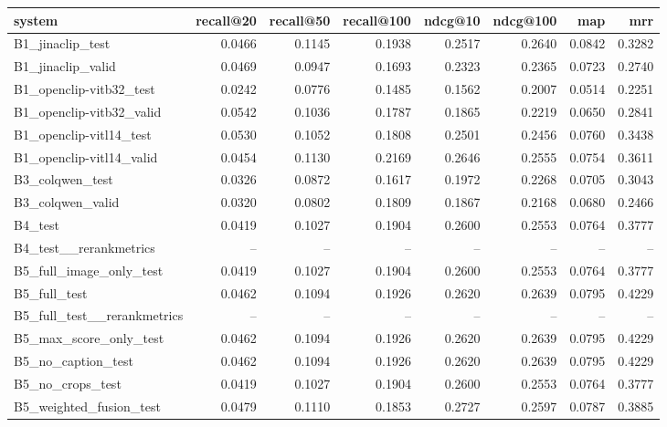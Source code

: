 \begin{tabular}{lrrrrrrr}
\toprule
system & recall@20 & recall@50 & recall@100 & ndcg@10 & ndcg@100 & map & mrr \\
\midrule
B1\_jinaclip\_test & 0.0466 & 0.1145 & 0.1938 & 0.2517 & 0.2640 & 0.0842 & 0.3282 \\
B1\_jinaclip\_valid & 0.0469 & 0.0947 & 0.1693 & 0.2323 & 0.2365 & 0.0723 & 0.2740 \\
B1\_openclip-vitb32\_test & 0.0242 & 0.0776 & 0.1485 & 0.1562 & 0.2007 & 0.0514 & 0.2251 \\
B1\_openclip-vitb32\_valid & 0.0542 & 0.1036 & 0.1787 & 0.1865 & 0.2219 & 0.0650 & 0.2841 \\
B1\_openclip-vitl14\_test & 0.0530 & 0.1052 & 0.1808 & 0.2501 & 0.2456 & 0.0760 & 0.3438 \\
B1\_openclip-vitl14\_valid & 0.0454 & 0.1130 & 0.2169 & 0.2646 & 0.2555 & 0.0754 & 0.3611 \\
B3\_colqwen\_test & 0.0326 & 0.0872 & 0.1617 & 0.1972 & 0.2268 & 0.0705 & 0.3043 \\
B3\_colqwen\_valid & 0.0320 & 0.0802 & 0.1809 & 0.1867 & 0.2168 & 0.0680 & 0.2466 \\
B4\_test & 0.0419 & 0.1027 & 0.1904 & 0.2600 & 0.2553 & 0.0764 & 0.3777 \\
B4\_test\_\_rerankmetrics & -- & -- & -- & -- & -- & -- & -- \\
B5\_full\_image\_only\_test & 0.0419 & 0.1027 & 0.1904 & 0.2600 & 0.2553 & 0.0764 & 0.3777 \\
B5\_full\_test & 0.0462 & 0.1094 & 0.1926 & 0.2620 & 0.2639 & 0.0795 & 0.4229 \\
B5\_full\_test\_\_rerankmetrics & -- & -- & -- & -- & -- & -- & -- \\
B5\_max\_score\_only\_test & 0.0462 & 0.1094 & 0.1926 & 0.2620 & 0.2639 & 0.0795 & 0.4229 \\
B5\_no\_caption\_test & 0.0462 & 0.1094 & 0.1926 & 0.2620 & 0.2639 & 0.0795 & 0.4229 \\
B5\_no\_crops\_test & 0.0419 & 0.1027 & 0.1904 & 0.2600 & 0.2553 & 0.0764 & 0.3777 \\
B5\_weighted\_fusion\_test & 0.0479 & 0.1110 & 0.1853 & 0.2727 & 0.2597 & 0.0787 & 0.3885 \\
\bottomrule
\end{tabular}